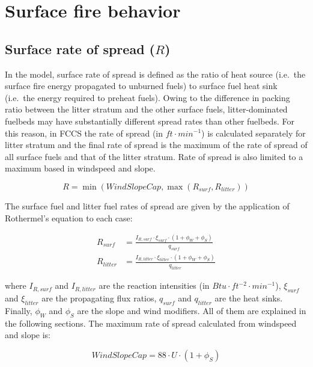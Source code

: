 \documentclass[]{book}
\begin{document}
\section{Surface fire behavior}\label{surface-fire-behavior}

\subsection{\texorpdfstring{Surface rate of spread
(\(R\))}{Surface rate of spread (R)}}\label{surface-rate-of-spread-r}

In the \citet{Rothermel1972} model, surface rate of spread is defined as
the ratio of heat source (i.e.~the surface fire energy propagated to
unburned fuels) to surface fuel heat sink (i.e.~the energy required to
preheat fuels). Owing to the difference in packing ratio between the
litter stratum and the other surface fuels, litter-dominated fuelbeds
may have substantially different spread rates than other fuelbeds. For
this reason, in FCCS the rate of spread (in \(ft \cdot min^{-1}\)) is
calculated separately for litter stratum and the final rate of spread is
the maximum of the rate of spread of all surface fuels and that of the
litter stratum. Rate of spread is also limited to a maximum based in
windspeed and slope.

\begin{equation}
R = \min(WindSlopeCap, \max(R_{surf}, R_{litter}))
\end{equation}

The surface fuel and litter fuel rates of spread are given by the
application of Rothermel's \citeyearpar{Rothermel1972} equation to each
case:

\begin{eqnarray} 
R_{surf} &= \frac{I_{R,surf} \cdot \xi_{surf}\cdot (1 + \phi_W + \phi_S)}{q_{surf}}\\
R_{litter} &= \frac{I_{R,litter} \cdot \xi_{litter}\cdot (1 + \phi_W + \phi_S)}{q_{litter}}
\end{eqnarray}

where \(I_{R,surf}\) and \(I_{R,litter}\) are the reaction intensities
(in \(Btu \cdot ft^{-2} \cdot min^{-1}\)), \(\xi_{surf}\) and
\(\xi_{litter}\) are the propagating flux ratios, \(q_{surf}\) and
\(q_{litter}\) are the heat sinks. Finally, \(\phi_W\) and \(\phi_S\)
are the slope and wind modifiers. All of them are explained in the
following sections. The maximum rate of spread calculated from windspeed
and slope is:

\begin{equation}
WindSlopeCap = 88 \cdot U \cdot (1 + \phi_S)
\end{equation}
\end{document}
